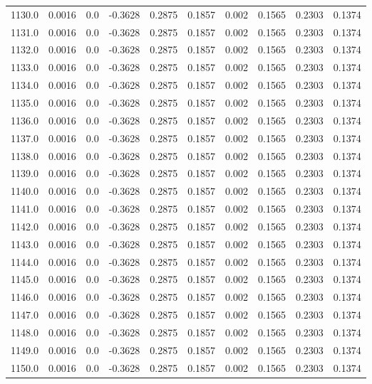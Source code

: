 \begin{longtable}{lrrrrrrrrr}
1130.0 & 0.0016 & 0.0 & -0.3628 & 0.2875 & 0.1857 & 0.002 & 0.1565 & 0.2303 & 0.1374 \\
1131.0 & 0.0016 & 0.0 & -0.3628 & 0.2875 & 0.1857 & 0.002 & 0.1565 & 0.2303 & 0.1374 \\
1132.0 & 0.0016 & 0.0 & -0.3628 & 0.2875 & 0.1857 & 0.002 & 0.1565 & 0.2303 & 0.1374 \\
1133.0 & 0.0016 & 0.0 & -0.3628 & 0.2875 & 0.1857 & 0.002 & 0.1565 & 0.2303 & 0.1374 \\
1134.0 & 0.0016 & 0.0 & -0.3628 & 0.2875 & 0.1857 & 0.002 & 0.1565 & 0.2303 & 0.1374 \\
1135.0 & 0.0016 & 0.0 & -0.3628 & 0.2875 & 0.1857 & 0.002 & 0.1565 & 0.2303 & 0.1374 \\
1136.0 & 0.0016 & 0.0 & -0.3628 & 0.2875 & 0.1857 & 0.002 & 0.1565 & 0.2303 & 0.1374 \\
1137.0 & 0.0016 & 0.0 & -0.3628 & 0.2875 & 0.1857 & 0.002 & 0.1565 & 0.2303 & 0.1374 \\
1138.0 & 0.0016 & 0.0 & -0.3628 & 0.2875 & 0.1857 & 0.002 & 0.1565 & 0.2303 & 0.1374 \\
1139.0 & 0.0016 & 0.0 & -0.3628 & 0.2875 & 0.1857 & 0.002 & 0.1565 & 0.2303 & 0.1374 \\
1140.0 & 0.0016 & 0.0 & -0.3628 & 0.2875 & 0.1857 & 0.002 & 0.1565 & 0.2303 & 0.1374 \\
1141.0 & 0.0016 & 0.0 & -0.3628 & 0.2875 & 0.1857 & 0.002 & 0.1565 & 0.2303 & 0.1374 \\
1142.0 & 0.0016 & 0.0 & -0.3628 & 0.2875 & 0.1857 & 0.002 & 0.1565 & 0.2303 & 0.1374 \\
1143.0 & 0.0016 & 0.0 & -0.3628 & 0.2875 & 0.1857 & 0.002 & 0.1565 & 0.2303 & 0.1374 \\
1144.0 & 0.0016 & 0.0 & -0.3628 & 0.2875 & 0.1857 & 0.002 & 0.1565 & 0.2303 & 0.1374 \\
1145.0 & 0.0016 & 0.0 & -0.3628 & 0.2875 & 0.1857 & 0.002 & 0.1565 & 0.2303 & 0.1374 \\
1146.0 & 0.0016 & 0.0 & -0.3628 & 0.2875 & 0.1857 & 0.002 & 0.1565 & 0.2303 & 0.1374 \\
1147.0 & 0.0016 & 0.0 & -0.3628 & 0.2875 & 0.1857 & 0.002 & 0.1565 & 0.2303 & 0.1374 \\
1148.0 & 0.0016 & 0.0 & -0.3628 & 0.2875 & 0.1857 & 0.002 & 0.1565 & 0.2303 & 0.1374 \\
1149.0 & 0.0016 & 0.0 & -0.3628 & 0.2875 & 0.1857 & 0.002 & 0.1565 & 0.2303 & 0.1374 \\
1150.0 & 0.0016 & 0.0 & -0.3628 & 0.2875 & 0.1857 & 0.002 & 0.1565 & 0.2303 & 0.1374 \\

\end{longtable}
